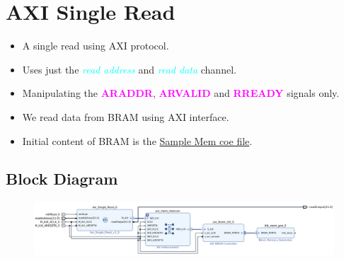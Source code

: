 \documentclass{article}
\newcommand{\chFormat}[1]{\emph{\textcolor{cyan}{#1}}}
\newcommand{\AXISignals}[1]{\textbf{\textcolor{magenta}{#1}}}
\begin{document}
\section{AXI Single Read}
\begin{itemize}
    \item A single read using AXI protocol.
    \item Uses just the \chFormat{read address} and \chFormat{read data} channel.
    \item Manipulating the \AXISignals{ARADDR}, \AXISignals{ARVALID} and \AXISignals{RREADY} signals only.
    \item We read data from BRAM using AXI interface.
    \item Initial content of BRAM is the \href{./MemFiles/SampleMemFile.coe}{Sample Mem coe file}.
\end{itemize}
\subsection{Block Diagram}
\begin{figure}[H]
    \centering
    \includegraphics[width=1\textwidth]{Resources/SingleReadBRAM.png}
\end{figure}
\end{document}
